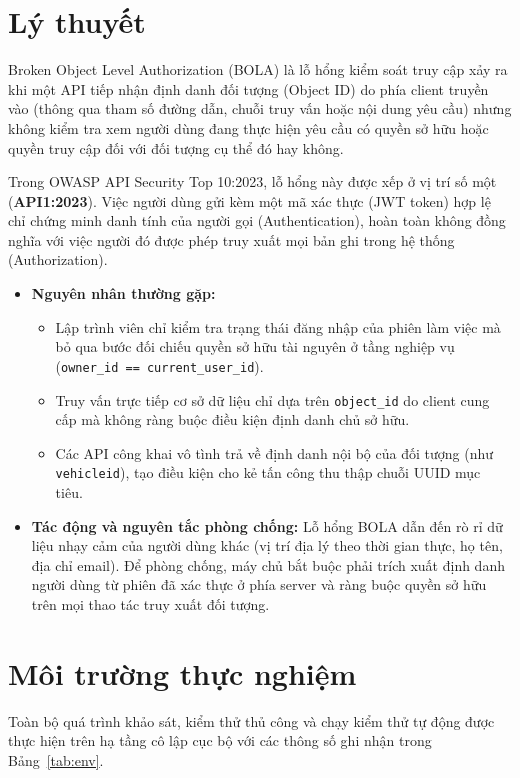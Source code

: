 \documentclass[11pt, a4paper]{article}
\begin{document}
\section{Lý thuyết}

Broken Object Level Authorization (BOLA) là lỗ hổng kiểm soát truy cập xảy ra khi một API tiếp nhận định danh đối tượng (Object ID) do phía client truyền vào (thông qua tham số đường dẫn, chuỗi truy vấn hoặc nội dung yêu cầu) nhưng không kiểm tra xem người dùng đang thực hiện yêu cầu có quyền sở hữu hoặc quyền truy cập đối với đối tượng cụ thể đó hay không.

Trong OWASP API Security Top 10:2023, lỗ hổng này được xếp ở vị trí số một (\textbf{API1:2023}). Việc người dùng gửi kèm một mã xác thực (JWT token) hợp lệ chỉ chứng minh danh tính của người gọi (Authentication), hoàn toàn không đồng nghĩa với việc người đó được phép truy xuất mọi bản ghi trong hệ thống (Authorization).

\begin{itemize}
    \item \textbf{Nguyên nhân thường gặp:}
    \begin{itemize}
        \item Lập trình viên chỉ kiểm tra trạng thái đăng nhập của phiên làm việc mà bỏ qua bước đối chiếu quyền sở hữu tài nguyên ở tầng nghiệp vụ (\texttt{owner\_id == current\_user\_id}).
        \item Truy vấn trực tiếp cơ sở dữ liệu chỉ dựa trên \texttt{object\_id} do client cung cấp mà không ràng buộc điều kiện định danh chủ sở hữu.
        \item Các API công khai vô tình trả về định danh nội bộ của đối tượng (như \texttt{vehicleid}), tạo điều kiện cho kẻ tấn công thu thập chuỗi UUID mục tiêu.
    \end{itemize}
    \item \textbf{Tác động và nguyên tắc phòng chống:} Lỗ hổng BOLA dẫn đến rò rỉ dữ liệu nhạy cảm của người dùng khác (vị trí địa lý theo thời gian thực, họ tên, địa chỉ email). Để phòng chống, máy chủ bắt buộc phải trích xuất định danh người dùng từ phiên đã xác thực ở phía server và ràng buộc quyền sở hữu trên mọi thao tác truy xuất đối tượng.
\end{itemize}

\section{Môi trường thực nghiệm}

Toàn bộ quá trình khảo sát, kiểm thử thủ công và chạy kiểm thử tự động được thực hiện trên hạ tầng cô lập cục bộ với các thông số ghi nhận trong Bảng~\ref{tab:env}.
\end{document}
